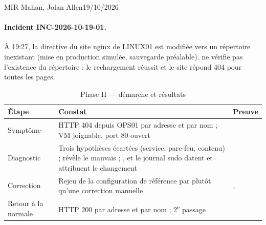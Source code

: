       {MIR Mahan, Jolan Allen}{19/10/2026}{\fait}

\paragraph{Incident INC-2026-10-19-01.} À 19:27, la directive  du site nginx de
LINUX01 est modifiée vers un répertoire inexistant (\og mise en production \fg{} simulée,
sauvegarde préalable).  ne vérifie pas l'existence du répertoire : le rechargement
réussit et le site répond 404 pour toutes les pages.


\begin{table}[H]
\centering
\caption{Phase H — démarche et résultats}\label{tab:phase-h}
\begin{tabularx}{\linewidth}{@{}P{2.4cm}LP{2.2cm}@{}}
\toprule
\textbf{Étape} & \textbf{Constat} & \textbf{Preuve} \\
\midrule
Symptôme & HTTP 404 depuis OPS01 par adresse et par nom ; VM joignable, port 80 ouvert &  \\
Diagnostic & Trois hypothèses écartées (service, pare-feu, contenu) ;  révèle le mauvais  ; ,  et le journal sudo datent et attribuent le changement &  \\
Correction & Rejeu de la configuration de référence par  plutôt qu'une correction manuelle & ,  \\
Retour à la normale & HTTP 200 par adresse et par nom ; 2\textsuperscript{e} passage  &  \\
\bottomrule
\end{tabularx}
\end{table}

